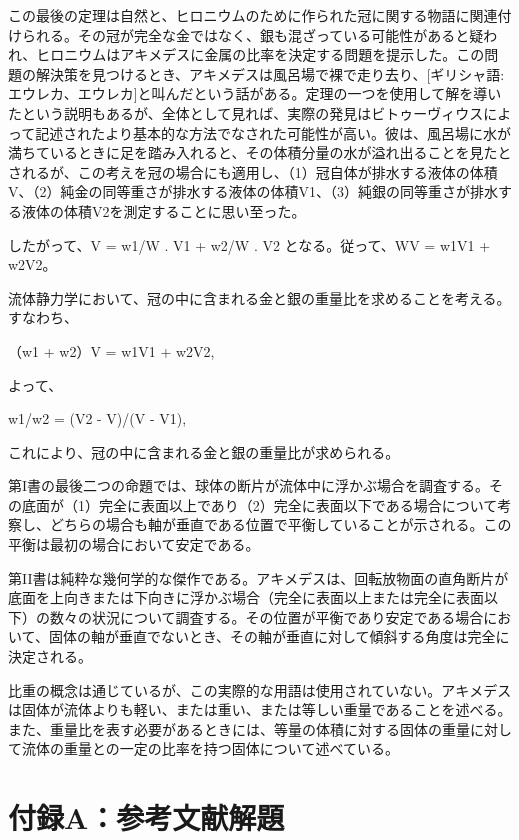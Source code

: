 \documentclass[a4paper,11pt,openany]{ltjsbook}
\begin{document}
この最後の定理は自然と、ヒロニウムのために作られた冠に関する物語に関連付けられる。その冠が完全な金ではなく、銀も混ざっている可能性があると疑われ、ヒロニウムはアキメデスに金属の比率を決定する問題を提示した。この問題の解決策を見つけるとき、アキメデスは風呂場で裸で走り去り、[ギリシャ語: エウレカ、エウレカ]と叫んだという話がある。定理の一つを使用して解を導いたという説明もあるが、全体として見れば、実際の発見はビトゥーヴィウスによって記述されたより基本的な方法でなされた可能性が高い。彼は、風呂場に水が満ちているときに足を踏み入れると、その体積分量の水が溢れ出ることを見たとされるが、この考えを冠の場合にも適用し、（1）冠自体が排水する液体の体積V、（2）純金の同等重さが排水する液体の体積V1、（3）純銀の同等重さが排水する液体の体積V2を測定することに思い至った。

したがって、V = w1/W . V1 + w2/W . V2 となる。従って、WV = w1V1 + w2V2。

流体静力学において、冠の中に含まれる金と銀の重量比を求めることを考える。すなわち、

（w1 + w2）V = w1V1 + w2V2,

よって、

w1/w2 = (V2 - V)/(V - V1),

これにより、冠の中に含まれる金と銀の重量比が求められる。

第I書の最後二つの命題では、球体の断片が流体中に浮かぶ場合を調査する。その底面が（1）完全に表面以上であり（2）完全に表面以下である場合について考察し、どちらの場合も軸が垂直である位置で平衡していることが示される。この平衡は最初の場合において安定である。

第II書は純粋な幾何学的な傑作である。アキメデスは、回転放物面の直角断片が底面を上向きまたは下向きに浮かぶ場合（完全に表面以上または完全に表面以下）の数々の状況について調査する。その位置が平衡であり安定である場合において、固体の軸が垂直でないとき、その軸が垂直に対して傾斜する角度は完全に決定される。

比重の概念は通じているが、この実際的な用語は使用されていない。アキメデスは固体が流体よりも軽い、または重い、または等しい重量であることを述べる。また、重量比を表す必要があるときには、等量の体積に対する固体の重量に対して流体の重量との一定の比率を持つ固体について述べている。

\clearpage

\chapter*{付録A：参考文献解題}
\end{document}
